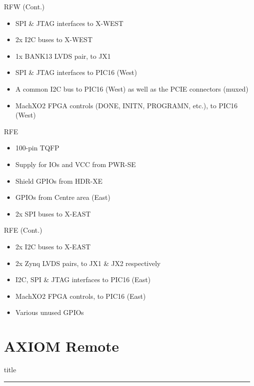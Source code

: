 \documentclass{beamer}
\begin{document}
\begin{frame}{RFW (Cont.)}
    \begin{itemize}
    \item SPI \& JTAG interfaces to X-WEST
    \item 2x I2C buses to X-WEST
    \item 1x BANK13 LVDS pair, to JX1
    \item SPI \& JTAG interfaces to PIC16 (West)
    \item A common I2C bus to PIC16 (West) as well as the PCIE connectors (muxed)
    \item MachXO2 FPGA controls (DONE, INITN, PROGRAMN, etc.), to PIC16 (West) 
    \end{itemize}
\end{frame}

\begin{frame}{RFE}
    \begin{itemize}
    \item 100-pin TQFP
    \item Supply for IOs and VCC from PWR-SE
    \item Shield GPIOs from HDR-XE 
    \item GPIOs from Centre area (East)
    \item 2x SPI buses to X-EAST
    \end{itemize}
\end{frame}

\begin{frame}{RFE (Cont.)}
    \begin{itemize}
    \item 2x I2C buses to X-EAST
    \item 2x Zynq LVDS pairs, to JX1 \& JX2 respectively
    \item I2C, SPI \& JTAG interfaces to PIC16 (East)
    \item MachXO2 FPGA controls, to PIC16 (East)
    \item Various unused GPIOs
    \end{itemize}
\end{frame}


\section{AXIOM Remote}

\begin{frame}[plain]
    \begin{beamercolorbox}[sep=8pt,center,shadow=true,rounded=true]{title}
        \insertsectionhead\par
        \color{apertus_orange}\noindent\rule{10cm}{1pt}
    \end{beamercolorbox}
\end{frame}
\end{document}

